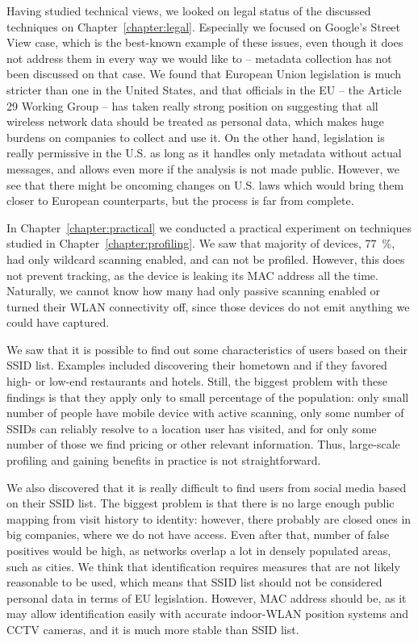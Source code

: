 \documentclass[12pt,a4paper,oneside,pdftex]{report}
\begin{document}
Having studied technical views, we looked on legal status of the discussed techniques on Chapter~\ref{chapter:legal}. Especially we focused on Google's Street View case, which is the best-known example of these issues, even though it does not address them in every way we would like to -- metadata collection has not been discussed on that case. We found that European Union legislation is much stricter than one in the United States, and that officials in the EU -- the Article 29 Working Group -- has taken really strong position on suggesting that all wireless network data should be treated as personal data, which makes huge burdens on companies to collect and use it. On the other hand, legislation is really permissive in the U.S. as long as it handles only metadata without actual messages, and allows even more if the analysis is not made public. However, we see that there might be oncoming changes on U.S. laws which would bring them closer to European counterparts, but the process is far from complete.

In Chapter~\ref{chapter:practical} we conducted a practical experiment on techniques studied in Chapter~\ref{chapter:profiling}. We saw that majority of devices, 77~\%, had only wildcard scanning enabled, and can not be profiled. However, this does not prevent tracking, as the device is leaking its MAC address all the time. Naturally, we cannot know how many had only passive scanning enabled or turned their WLAN connectivity off, since those devices do not emit anything we could have captured.

We saw that it is possible to find out some characteristics of users based on their SSID list. Examples included discovering their hometown and if they favored high- or low-end restaurants and hotels. Still, the biggest problem with these findings is that they apply only to small percentage of the population: only small number of people have mobile device with active scanning, only some number of SSIDs can reliably resolve to a location user has visited, and for only some number of those we find pricing or other relevant information. Thus, large-scale profiling and gaining benefits in practice is not straightforward.

We also discovered that it is really difficult to find users from social media based on their SSID list. The biggest problem is that there is no large enough public mapping from visit history to identity: however, there probably are closed ones in big companies, where we do not have access. Even after that, number of false positives would be high, as networks overlap a lot in densely populated areas, such as cities. We think that identification requires measures that are not likely reasonable to be used, which means that SSID list should not be considered personal data in terms of EU legislation. However, MAC address should be, as it may allow identification easily with accurate indoor-WLAN position systems and CCTV cameras, and it is much more stable than SSID list.
\end{document}
